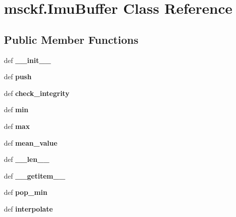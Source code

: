 \hypertarget{classmsckf_1_1_imu_buffer}{\section{msckf.\-Imu\-Buffer Class Reference}
\label{classmsckf_1_1_imu_buffer}
}
\subsection*{Public Member Functions}
\begin{DoxyCompactItemize}
\item 
\hypertarget{classmsckf_1_1_imu_buffer_a6a576e23425beb88711a0b6c9fd00d6e}{def {\bfseries \-\_\-\-\_\-init\-\_\-\-\_\-}}\label{classmsckf_1_1_imu_buffer_a6a576e23425beb88711a0b6c9fd00d6e}

\item 
\hypertarget{classmsckf_1_1_imu_buffer_a93afe342c8d427e7a7c9bd2f1964308b}{def {\bfseries push}}\label{classmsckf_1_1_imu_buffer_a93afe342c8d427e7a7c9bd2f1964308b}

\item 
\hypertarget{classmsckf_1_1_imu_buffer_a698da50c389659d3c762ddc2251296e3}{def {\bfseries check\-\_\-integrity}}\label{classmsckf_1_1_imu_buffer_a698da50c389659d3c762ddc2251296e3}

\item 
\hypertarget{classmsckf_1_1_imu_buffer_a359f10c40136ea9c4e75c6c3cb2f4310}{def {\bfseries min}}\label{classmsckf_1_1_imu_buffer_a359f10c40136ea9c4e75c6c3cb2f4310}

\item 
\hypertarget{classmsckf_1_1_imu_buffer_adb77be97e9cfe0e5a3e58c607c9dfebe}{def {\bfseries max}}\label{classmsckf_1_1_imu_buffer_adb77be97e9cfe0e5a3e58c607c9dfebe}

\item 
\hypertarget{classmsckf_1_1_imu_buffer_ab0e45309457a41cad3d1783e45c43830}{def {\bfseries mean\-\_\-value}}\label{classmsckf_1_1_imu_buffer_ab0e45309457a41cad3d1783e45c43830}

\item 
\hypertarget{classmsckf_1_1_imu_buffer_a747a692ef45bcb6b4c2736e34900453d}{def {\bfseries \-\_\-\-\_\-len\-\_\-\-\_\-}}\label{classmsckf_1_1_imu_buffer_a747a692ef45bcb6b4c2736e34900453d}

\item 
\hypertarget{classmsckf_1_1_imu_buffer_a368b04188fcaaaf0fea135d733618edb}{def {\bfseries \-\_\-\-\_\-getitem\-\_\-\-\_\-}}\label{classmsckf_1_1_imu_buffer_a368b04188fcaaaf0fea135d733618edb}

\item 
\hypertarget{classmsckf_1_1_imu_buffer_ad767ec99d974d97547882580f9817698}{def {\bfseries pop\-\_\-min}}\label{classmsckf_1_1_imu_buffer_ad767ec99d974d97547882580f9817698}

\item 
\hypertarget{classmsckf_1_1_imu_buffer_aa10df9ce04292c14a6d6ff9ee0b1921d}{def {\bfseries interpolate}}\label{classmsckf_1_1_imu_buffer_aa10df9ce04292c14a6d6ff9ee0b1921d}

\end{DoxyCompactItemize}
